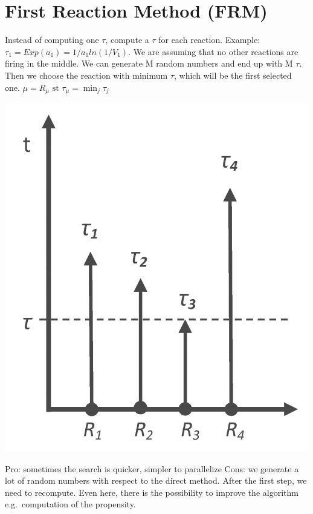 \section{First Reaction Method (FRM)}
Instead of computing one $\tau$, compute a $\tau$ for each reaction.
Example: $\tau_1 = Exp(a_1)=1/a_1ln(1/V_1)$.
We are assuming that no other reactions are firing in the middle.
We can generate M random numbers and end up with M $\tau$.
Then we choose the reaction with minimum $\tau$, which will be the first selected one.
$\mu= R_{\mu}\text{ st }\tau_{\mu}= \min_{j}\tau_j$

\includegraphics{R_tau.png}

Pro: sometimes the search is quicker, simpler to parallelize Cons: we generate a lot of random numbers with respect to the direct method.
After the first step, we need to recompute.
Even here, there is the possibility to improve the algorithm e.g.~computation of the propensity.


